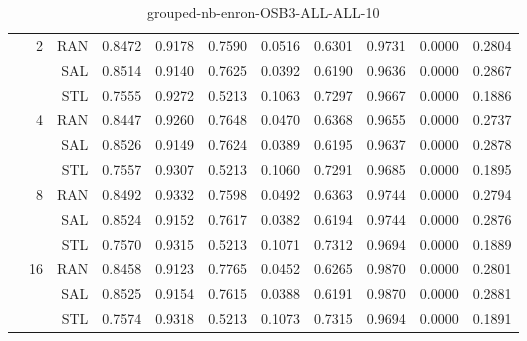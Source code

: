 \begin{center}
\begin{table}[htbp]
\begin{center}
\begin{tabular}{ | r | r | r | r | r | r | r | r | r | r | r |}
 & \multirow{3}{*}{2} & RAN & 0.8472 & 0.9178 & 0.7590 & 0.0516 & 0.6301 & 0.9731 & 0.0000 & 0.2804\\ \cline{3-11}
 &   & SAL & 0.8514 & 0.9140 & 0.7625 & 0.0392 & 0.6190 & 0.9636 & 0.0000 & 0.2867\\ \cline{3-11}
 &   & STL & 0.7555 & 0.9272 & 0.5213 & 0.1063 & 0.7297 & 0.9667 & 0.0000 & 0.1886\\ \cline{2-11}
 & \multirow{3}{*}{4} & RAN & 0.8447 & 0.9260 & 0.7648 & 0.0470 & 0.6368 & 0.9655 & 0.0000 & 0.2737\\ \cline{3-11}
 &   & SAL & 0.8526 & 0.9149 & 0.7624 & 0.0389 & 0.6195 & 0.9637 & 0.0000 & 0.2878\\ \cline{3-11}
 &   & STL & 0.7557 & 0.9307 & 0.5213 & 0.1060 & 0.7291 & 0.9685 & 0.0000 & 0.1895\\ \cline{2-11}
 & \multirow{3}{*}{8} & RAN & 0.8492 & 0.9332 & 0.7598 & 0.0492 & 0.6363 & 0.9744 & 0.0000 & 0.2794\\ \cline{3-11}
 &   & SAL & 0.8524 & 0.9152 & 0.7617 & 0.0382 & 0.6194 & 0.9744 & 0.0000 & 0.2876\\ \cline{3-11}
 &   & STL & 0.7570 & 0.9315 & 0.5213 & 0.1071 & 0.7312 & 0.9694 & 0.0000 & 0.1889\\ \cline{2-11}
 & \multirow{3}{*}{16} & RAN & 0.8458 & 0.9123 & 0.7765 & 0.0452 & 0.6265 & 0.9870 & 0.0000 & 0.2801\\ \cline{3-11}
 &   & SAL & 0.8525 & 0.9154 & 0.7615 & 0.0388 & 0.6191 & 0.9870 & 0.0000 & 0.2881\\ \cline{3-11}
 &   & STL & 0.7574 & 0.9318 & 0.5213 & 0.1073 & 0.7315 & 0.9694 & 0.0000 & 0.1891\\ \cline{2-11}
\hline
\end{tabular}
\caption{grouped-nb-enron-OSB3-ALL-ALL-10}
\end{center}
 \end{table}
\end{center}

